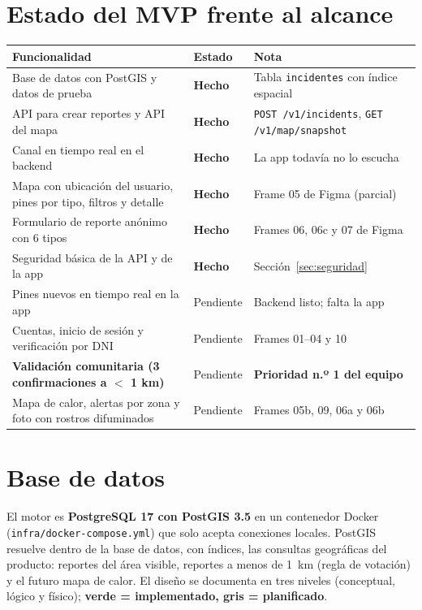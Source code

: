 \documentclass[10pt,a4paper]{article}
\newcommand{\hecho}{\textcolor{ok}{\textbf{Hecho}}}
\newcommand{\pend}{\textcolor{pend}{Pendiente}}
\newcommand{\ruta}[1]{\texttt{\footnotesize #1}}
\begin{document}
\section{Estado del MVP frente al alcance}
{\footnotesize
\begin{tabular}{@{}p{6.9cm}p{1.3cm}p{8.5cm}@{}}
\toprule
\textbf{Funcionalidad} & \textbf{Estado} & \textbf{Nota}\\
\midrule
Base de datos con PostGIS y datos de prueba & \hecho & Tabla \texttt{incidentes} con índice espacial\\
API para crear reportes y API del mapa & \hecho & \texttt{POST /v1/incidents}, \texttt{GET /v1/map/snapshot}\\
Canal en tiempo real en el backend & \hecho & La app todavía no lo escucha\\
Mapa con ubicación del usuario, pines por tipo, filtros y detalle & \hecho & Frame 05 de Figma (parcial)\\
Formulario de reporte anónimo con 6 tipos & \hecho & Frames 06, 06c y 07 de Figma\\
Seguridad básica de la API y de la app & \hecho & Sección~\ref{sec:seguridad}\\
Pines nuevos en tiempo real en la app & \pend & Backend listo; falta la app\\
Cuentas, inicio de sesión y verificación por DNI & \pend & Frames 01--04 y 10\\
\textbf{Validación comunitaria (3 confirmaciones a $<$ 1 km)} & \pend & \textbf{Prioridad n.º 1 del equipo}\\
Mapa de calor, alertas por zona y foto con rostros difuminados & \pend & Frames 05b, 09, 06a y 06b\\
\bottomrule
\end{tabular}}

\section{Base de datos}
\label{sec:bd}
El motor es \textbf{PostgreSQL 17 con PostGIS 3.5} en un contenedor Docker (\ruta{infra/docker-compose.yml}) que solo acepta conexiones locales. PostGIS resuelve dentro de la base de datos, con índices, las consultas geográficas del producto: reportes del área visible, reportes a menos de 1~km (regla de votación) y el futuro mapa de calor. El diseño se documenta en tres niveles (conceptual, lógico y físico); \textbf{verde = implementado, gris = planificado}.
\end{document}
